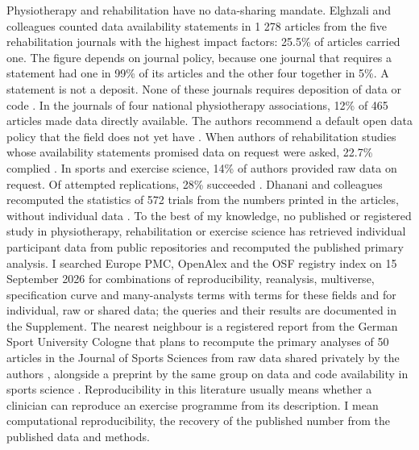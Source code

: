 Physiotherapy and rehabilitation have no data-sharing mandate. Elghzali and colleagues counted data availability statements in 1 278 articles from the five rehabilitation journals with the highest impact factors: 25.5\% of articles carried one. The figure depends on journal policy, because one journal that requires a statement had one in 99\% of its articles and the other four together in 5\%. A statement is not a deposit. None of these journals requires deposition of data or code \cite{Elghzali_2025}. In the journals of four national physiotherapy associations, 12\% of 465 articles made data directly available. The authors recommend a default open data policy that the field does not yet have \cite{Jabouille_2025}. When authors of rehabilitation studies whose availability statements promised data on request were asked, 22.7\% complied \cite{Elghzali_2025}. In sports and exercise science, 14\% of authors provided raw data on request. Of attempted replications, 28\% succeeded \cite{Murphy_2025}. Dhanani and colleagues recomputed the statistics of 572 trials from the numbers printed in the articles, without individual data \cite{Dhanani_2022}. To the best of my knowledge, no published or registered study in physiotherapy, rehabilitation or exercise science has retrieved individual participant data from public repositories and recomputed the published primary analysis. I searched Europe PMC, OpenAlex and the OSF registry index on 15 September 2026 for combinations of reproducibility, reanalysis, multiverse, specification curve and many-analysts terms with terms for these fields and for individual, raw or shared data; the queries and their results are documented in the Supplement. The nearest neighbour is a registered report from the German Sport University Cologne that plans to recompute the primary analyses of 50 articles in the Journal of Sports Sciences from raw data shared privately by the authors \cite{Nolte_2026_reg}, alongside a preprint by the same group on data and code availability in sports science \cite{Nolte_2026_preprint}. Reproducibility in this literature usually means whether a clinician can reproduce an exercise programme from its description. I mean computational reproducibility, the recovery of the published number from the published data and methods.

